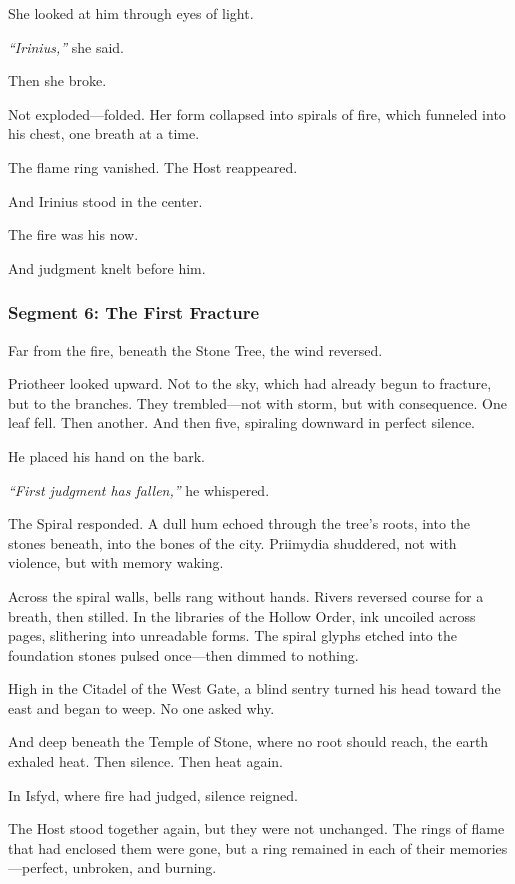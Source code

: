 \documentclass[9pt]{article}
\begin{document}
She looked at him through eyes of light.

\textit{``Irinius,''} she said.

Then she broke.

Not exploded—folded. Her form collapsed into spirals of fire, which funneled into his chest, one breath at a time.

The flame ring vanished. The Host reappeared.

And Irinius stood in the center.

The fire was his now.

And judgment knelt before him.

\newpage

\subsubsection*{Segment 6: The First Fracture}

Far from the fire, beneath the Stone Tree, the wind reversed.

Priotheer looked upward. Not to the sky, which had already begun to fracture, but to the branches. They trembled—not with storm, but with consequence. One leaf fell. Then another. And then five, spiraling downward in perfect silence.

He placed his hand on the bark.

\textit{``First judgment has fallen,''} he whispered.

The Spiral responded. A dull hum echoed through the tree's roots, into the stones beneath, into the bones of the city. Priimydia shuddered, not with violence, but with memory waking.

Across the spiral walls, bells rang without hands. Rivers reversed course for a breath, then stilled. In the libraries of the Hollow Order, ink uncoiled across pages, slithering into unreadable forms. The spiral glyphs etched into the foundation stones pulsed once—then dimmed to nothing.

High in the Citadel of the West Gate, a blind sentry turned his head toward the east and began to weep. No one asked why.

And deep beneath the Temple of Stone, where no root should reach, the earth exhaled heat. Then silence. Then heat again.

In Isfyd, where fire had judged, silence reigned.

The Host stood together again, but they were not unchanged. The rings of flame that had enclosed them were gone, but a ring remained in each of their memories—perfect, unbroken, and burning.
\end{document}
